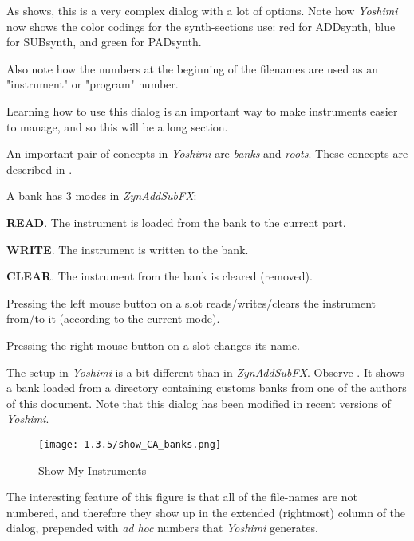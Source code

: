    As 
   shows, this is a very complex dialog with a lot of options.
   Note how \textsl{Yoshimi} now shows the color codings for the
   synth-sections use:  red for ADDsynth, blue for SUBsynth, and
   green for PADsynth.

   Also note how the numbers at the beginning of the filenames are used as
   an "instrument" or "program" number.

   Learning how to use this dialog is an important way to make
   instruments easier to manage, and so this will be a long section.

   An important pair of concepts in \textsl{Yoshimi} are
   \textsl{banks} and \textsl{roots}.  These concepts are described in
   .

   A bank has 3 modes in \textsl{ZynAddSubFX}: 

   \begin{enumber}
      \item \textbf{READ}.
         The instrument is loaded from the bank to the current part.
      \item \textbf{WRITE}.
         The instrument is written to the bank.
      \item \textbf{CLEAR}.
         The instrument from the bank is cleared (removed).
   \end{enumber}

   Pressing the left mouse button on a slot reads/writes/clears the
   instrument from/to it (according to the current mode).
   
   Pressing the right mouse button on a slot changes its name.

   The setup in \textsl{Yoshimi} is a bit different than in
   \textsl{ZynAddSubFX}.
   Observe .
   It shows a bank loaded from a directory containing customs
   banks from one of the authors of this document.
   Note that this dialog has been modified in recent versions of
   \textsl{Yoshimi}.


\begin{figure}[H]
   \centering 
   \texttt{[image: 1.3.5/show\_CA\_banks.png]}
   \caption[Show CA's Instruments]{Show My Instruments}
   \label{fig:show_ca_bank}
\end{figure}

   The interesting feature of this figure is that
   all of the file-names are not numbered, and therefore they show up in the
   extended (rightmost) column of the dialog, prepended with
   \textsl{ad hoc} numbers that \textsl{Yoshimi} generates.

